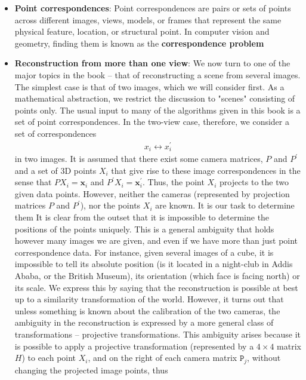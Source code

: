 \documentclass{report}
\begin{document}
\begin{itemize}
        \item \textbf{Point correspondences}: Point correspondences are pairs or sets of points across different images, views, models, or frames that represent the same physical feature, location, or structural point. In computer vision and geometry, finding them is known as the \textbf{correspondence problem}
        \item \textbf{Reconstruction from more than one view}: We now turn to one of the major topics in the book – that of reconstructing a scene from several images. The simplest case is that of two images, which we will consider first. As a mathematical abstraction, we restrict the discussion to "scenes" consisting of points only.
            \bigbreak \noindent 
            The usual input to many of the algorithms given in this book is a set of point correspondences. In the two-view case, therefore, we consider a set of correspondences
            \begin{align*}
                x_{i} \leftrightarrow x_{i}^{\prime}
            \end{align*}
            in two images. It is assumed that there exist some camera matrices, $P$ and $P^{\prime}$ and a set of 3D points $X_{i}$ that give rise to these image correspondences in the sense that $PX_{i}=\mathbf{x}_{i}$ and $P^{\prime}X_{i}=\mathbf{x}_{i}^{\prime}$. Thus, the point $X_{i}$ projects to the two given data points. However, neither the cameras (represented by projection matrices $P$ and $P^{\prime}$), nor the points $X_{i}$ are known. It is our task to determine them
            \bigbreak \noindent 
            It is clear from the outset that it is impossible to determine the positions of the points uniquely. This is a general ambiguity that holds however many images we are given, and even if we have more than just point correspondence data. For instance, given several images of a cube, it is impossible to tell its absolute position (is it located in a night-club in Addis Ababa, or the British Museum), its orientation (which face is facing north) or its scale. We express this by saying that the reconstruction is possible at best up to a similarity transformation of the world. However, it turns out that unless something is known about the calibration of the two cameras, the ambiguity in the reconstruction is expressed by a more general class of transformations – projective transformations.
            \bigbreak \noindent 
            This ambiguity arises because it is possible to apply a projective transformation (represented by a $4\times 4$ matrix $H$) to each point $X_{i}$, and on the right of each camera matrix $\mathtt{P}_{j}$, without changing the projected image points, thus

\end{itemize}
\end{document}
